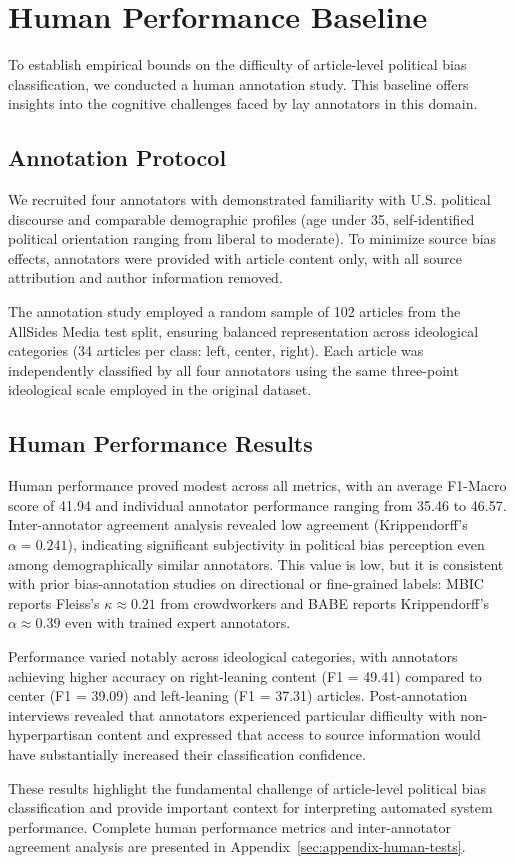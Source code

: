 
\section{Human Performance Baseline}
\label{sec:human-baseline}

To establish empirical bounds on the difficulty of article-level political bias classification, we conducted a human annotation study. This baseline offers insights into the cognitive challenges faced by lay annotators in this domain.

\subsection{Annotation Protocol}

We recruited four annotators with demonstrated familiarity with U.S. political discourse and comparable demographic profiles (age under 35, self-identified political orientation ranging from liberal to moderate). To minimize source bias effects, annotators were provided with article content only, with all source attribution and author information removed.

The annotation study employed a random sample of 102 articles from the AllSides Media test split, ensuring balanced representation across ideological categories (34 articles per class: left, center, right). Each article was independently classified by all four annotators using the same three-point ideological scale employed in the original dataset.

\subsection{Human Performance Results}

Human performance proved modest across all metrics, with an average F1-Macro score of 41.94 and individual annotator performance ranging from 35.46 to 46.57. Inter-annotator agreement analysis revealed low agreement (Krippendorff's $\alpha = 0.241$), indicating significant subjectivity in political bias perception even among demographically similar annotators. This value is low, but it is consistent with prior bias-annotation studies on directional or fine-grained labels: MBIC \citep{spinde2021mbic} reports Fleiss's $\kappa \approx 0.21$ from crowdworkers and BABE \citep{spinde2021babe} reports Krippendorff's $\alpha \approx 0.39$ even with trained expert annotators.

Performance varied notably across ideological categories, with annotators achieving higher accuracy on right-leaning content (F1 = 49.41) compared to center (F1 = 39.09) and left-leaning (F1 = 37.31) articles. Post-annotation interviews revealed that annotators experienced particular difficulty with non-hyperpartisan content and expressed that access to source information would have substantially increased their classification confidence.

These results highlight the fundamental challenge of article-level political bias classification and provide important context for interpreting automated system performance. Complete human performance metrics and inter-annotator agreement analysis are presented in Appendix~\ref{sec:appendix-human-tests}.
